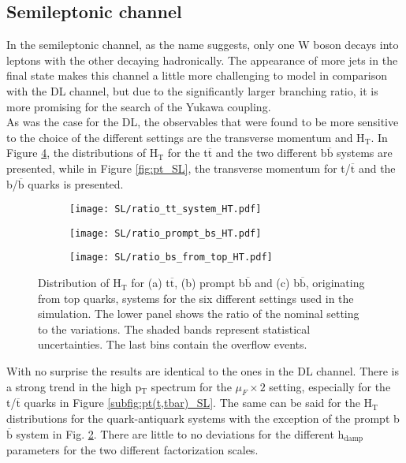\subsection{\label{SL}Semileptonic channel}
\noindent In the semileptonic channel, as the name suggests, only one W boson decays into leptons with the other decaying hadronically. The appearance of more jets in the final state makes this channel a little more challenging to model in comparison with the DL channel, but due to the significantly larger branching ratio, it is more promising for the search of the Yukawa coupling.\\
\indent As was the case for the DL, the observables that were found to be more sensitive to the choice of the different settings are the transverse momentum and H$_{\text{T}}$. In Figure \ref{fig:HT_SL}, the distributions of H$_{\text{T}}$ for the t$\overline{\text{t}}$ and the two different b$\overline{\text{b}}$ systems are presented, while in Figure \ref{fig:pt_SL}, the transverse momentum for t/$\overline{\text{t}}$ and the b/$\overline{\text{b}}$ quarks is presented.\\
\begin{figure}[H]
    \centering
    \begin{subfigure}{0.49\textwidth}
        \centering
        \texttt{[image: SL/ratio\_tt\_system\_HT.pdf]}
        \caption{}
        \label{subfig:HT(ttbar)_SL}
    \end{subfigure}
    \hfill
    \begin{subfigure}{0.49\textwidth}
        \centering
        \texttt{[image: SL/ratio\_prompt\_bs\_HT.pdf]}
        \caption{}
        \label{subfig:HT(bbbar_prompt)_SL}
    \end{subfigure}
    \hfill
    \begin{subfigure}{0.49\textwidth}
        \centering
        \texttt{[image: SL/ratio\_bs\_from\_top\_HT.pdf]}
        \caption{}
        \label{subfig:HT(bbbar)_SL}
    \end{subfigure}
    \caption{Distribution of H$_{\text{T}}$ for (a) t$\overline{\text{t}}$, (b) prompt b$\overline{\text{b}}$ and (c) b$\overline{\text{b}}$, originating from top quarks, systems for the six different settings used in the simulation. The lower panel shows the ratio of the nominal setting to the variations. The shaded bands represent statistical uncertainties. The last bins contain the overflow events.}
    \label{fig:HT_SL}
\end{figure}
\indent With no surprise the results are identical to the ones in the DL channel. There is a strong trend in the high p$_{\text{T}}$ spectrum for the $\mu_F \times 2$ setting, especially for the t/$\overline{\text{t}}$ quarks in Figure \ref{subfig:pt(t,tbar)_SL}. The same can be said for the H$_{\text{T}}$ distributions for the quark-antiquark systems with the exception of the prompt b$\overline{\text{b}}$ system in Fig. \ref{subfig:HT(bbbar_prompt)_SL}. There are little to no deviations for the different h$_{\text{damp}}$ parameters for the two different factorization scales.\\
